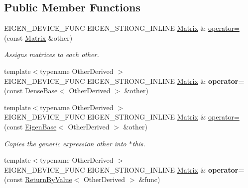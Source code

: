 \subsection*{Public Member Functions}
\begin{DoxyCompactItemize}
\item 
E\+I\+G\+E\+N\+\_\+\+D\+E\+V\+I\+C\+E\+\_\+\+F\+U\+NC E\+I\+G\+E\+N\+\_\+\+S\+T\+R\+O\+N\+G\+\_\+\+I\+N\+L\+I\+NE \mbox{\hyperlink{class_eigen_1_1_matrix}{Matrix}} \& \mbox{\hyperlink{class_eigen_1_1_matrix_aa123b56b10819a0cbf5164abb242102f}{operator=}} (const \mbox{\hyperlink{class_eigen_1_1_matrix}{Matrix}} \&other)
\begin{DoxyCompactList}\small\item\em Assigns matrices to each other. \end{DoxyCompactList}\item 
\mbox{\label{class_eigen_1_1_matrix_ab8954f0abbd0d60292ee7a3af2866f96}} 
{\footnotesize template$<$typename Other\+Derived $>$ }\\E\+I\+G\+E\+N\+\_\+\+D\+E\+V\+I\+C\+E\+\_\+\+F\+U\+NC E\+I\+G\+E\+N\+\_\+\+S\+T\+R\+O\+N\+G\+\_\+\+I\+N\+L\+I\+NE \mbox{\hyperlink{class_eigen_1_1_matrix}{Matrix}} \& {\bfseries operator=} (const \mbox{\hyperlink{class_eigen_1_1_dense_base}{Dense\+Base}}$<$ Other\+Derived $>$ \&other)
\item 
{\footnotesize template$<$typename Other\+Derived $>$ }\\E\+I\+G\+E\+N\+\_\+\+D\+E\+V\+I\+C\+E\+\_\+\+F\+U\+NC E\+I\+G\+E\+N\+\_\+\+S\+T\+R\+O\+N\+G\+\_\+\+I\+N\+L\+I\+NE \mbox{\hyperlink{class_eigen_1_1_matrix}{Matrix}} \& \mbox{\hyperlink{class_eigen_1_1_matrix_ae1be4ae99dbfc91c6a3a0d0af7165047}{operator=}} (const \mbox{\hyperlink{struct_eigen_1_1_eigen_base}{Eigen\+Base}}$<$ Other\+Derived $>$ \&other)
\begin{DoxyCompactList}\small\item\em Copies the generic expression {\itshape other} into $\ast$this. \end{DoxyCompactList}\item 
\mbox{\label{class_eigen_1_1_matrix_a90469114e7a3c899f2217cf35e4778f3}} 
{\footnotesize template$<$typename Other\+Derived $>$ }\\E\+I\+G\+E\+N\+\_\+\+D\+E\+V\+I\+C\+E\+\_\+\+F\+U\+NC E\+I\+G\+E\+N\+\_\+\+S\+T\+R\+O\+N\+G\+\_\+\+I\+N\+L\+I\+NE \mbox{\hyperlink{class_eigen_1_1_matrix}{Matrix}} \& {\bfseries operator=} (const \mbox{\hyperlink{class_eigen_1_1_return_by_value}{Return\+By\+Value}}$<$ Other\+Derived $>$ \&func)

\end{DoxyCompactItemize}
